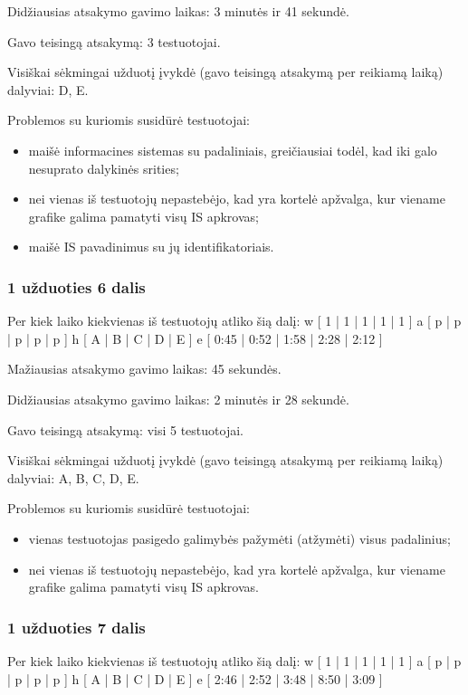 Didžiausias atsakymo gavimo laikas: 3 minutės ir 41 sekundė.

Gavo teisingą atsakymą: 3 testuotojai.

Visiškai sėkmingai užduotį įvykdė (gavo teisingą atsakymą per reikiamą 
laiką) dalyviai: D, E.

Problemos su kuriomis susidūrė testuotojai:
\begin{itemize}
  \item maišė informacines sistemas su padaliniais, greičiausiai todėl,
    kad iki galo nesuprato dalykinės srities;
  \item nei vienas iš testuotojų nepastebėjo, kad yra kortelė apžvalga,
    kur viename grafike galima pamatyti visų IS apkrovas;
  \item maišė IS pavadinimus su jų identifikatoriais.
\end{itemize}

\subsubsection{1 užduoties 6 dalis}

Per kiek laiko kiekvienas iš testuotojų atliko šią dalį:
\xtable
{
  w [ 1 | 1 | 1 | 1 | 1 ]
  a [ p | p | p | p | p ]
  h [ A | B | C | D | E ]
  e [ 0:45 | 0:52 | 1:58 | 2:28 | 2:12 ]
}

Mažiausias atsakymo gavimo laikas: 45 sekundės.

Didžiausias atsakymo gavimo laikas: 2 minutės ir 28 sekundė.

Gavo teisingą atsakymą: visi 5 testuotojai.

Visiškai sėkmingai užduotį įvykdė (gavo teisingą atsakymą per reikiamą 
laiką) dalyviai: A, B, C, D, E.

Problemos su kuriomis susidūrė testuotojai:
\begin{itemize}
  \item vienas testuotojas pasigedo galimybės pažymėti (atžymėti) visus
    padalinius;
  \item nei vienas iš testuotojų nepastebėjo, kad yra kortelė apžvalga,
    kur viename grafike galima pamatyti visų IS apkrovas.
\end{itemize}

\subsubsection{1 užduoties 7 dalis}

Per kiek laiko kiekvienas iš testuotojų atliko šią dalį:
\xtable
{
  w [ 1 | 1 | 1 | 1 | 1 ]
  a [ p | p | p | p | p ]
  h [ A | B | C | D | E ]
  e [ 2:46 | 2:52 | 3:48 | 8:50 | 3:09 ]
}

